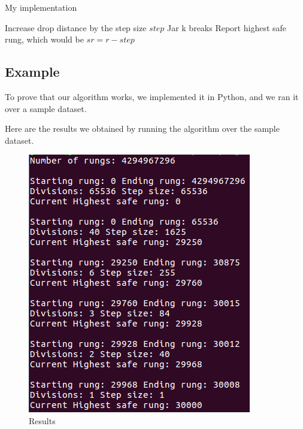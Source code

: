 \documentclass{article}
\begin{document}
\begin{algorithm}[H]
\caption{My implementation}
\begin{algorithmic}[1]
  \State Increase drop distance by the step size $step$
   \State Jar k  breaks
   \State Report highest safe rung, which would be $sr = r - step$

   \EndIf
  \EndIf
 \EndWhile
\EndFunction
\end{algorithmic}
\end{algorithm}

\subsection*{Example}

To prove that our algorithm works, we implemented it in Python, and we ran it over a sample dataset.



Here are the results we obtained by running the algorithm over the sample dataset.

\begin{figure}[H]
\begin{center}
\includegraphics[scale=.8]{problem1b}
\end{center}
\caption{Results}
\end{figure}
\end{document}
